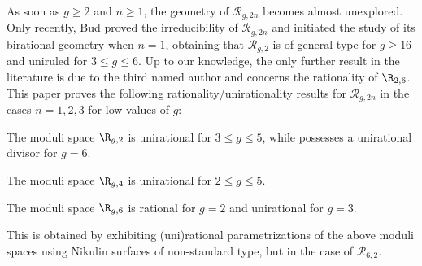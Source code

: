 As soon as $g\geq 2$ and $n\geq 1$, the geometry of $\mathcal R_{g,2n}$ becomes almost unexplored. Only recently, Bud \cite{Bu} proved the irreducibility of $\mathcal R_{g,2n}$ and initiated the study of its birational geometry when $n=1$, obtaining that $\mathcal R_{g,2}$ is of general type for $g\geq 16$ and uniruled for $3\leq g\leq 6$. Up to our knowledge, the only further result in the literature is due to the third named author \cite{NOV} and concerns the rationality of $\R_{2,6}$. This paper proves the following rationality/unirationality results for $\mathcal R_{g,2n}$ in the cases $n=1,2,3$ for low values of $g$:

\skpt
\begin{thm}\label{pescara}
\begin{enumeratea}
\item
The moduli space $\R_{g,2}$ is unirational for $3\leq g\leq 5$, while possesses a unirational divisor for $g=6$. 
\item
The moduli space $\R_{g,4}$ is unirational for $2\leq g\leq 5$.
\item
The moduli space $\R_{g,6}$ is rational for $g=2$ and unirational for $g=3$. 
\end{enumeratea}
\end{thm}

This is obtained by exhibiting (uni)rational parametrizations of the above moduli spaces using Nikulin surfaces of non-standard type, but in the case of $\mathcal R_{6,2}$.

